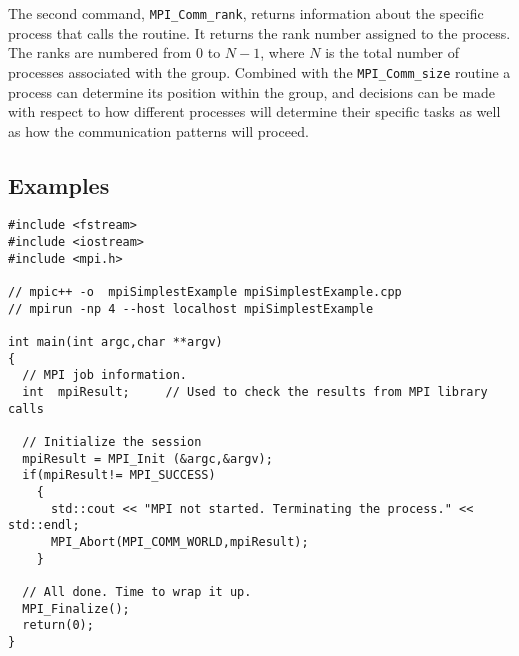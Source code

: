 The second command, \texttt{MPI\_Comm\_rank}, returns information
about the specific process that calls the routine. It returns the rank
number assigned to the process. The ranks are numbered from 0 to
$N-1$, where $N$ is the total number of processes associated with the
group. Combined with the \texttt{MPI\_Comm\_size} routine a process
can determine its position within the group, and decisions can be made
with respect to how different processes will determine their specific
tasks as well as how the communication patterns will proceed.

\subsection{Examples}


\lstset{language=C++, numbers=left, numberstyle=\tiny, stepnumber=1,
  numbersep=5pt, commentstyle=\scriptsize}
\begin{lstlisting}[caption={Simplest MPI Program},
                   basicstyle=\scriptsize,
                   label=listing:simplestProcess]
#include <fstream>
#include <iostream>
#include <mpi.h>

// mpic++ -o  mpiSimplestExample mpiSimplestExample.cpp 
// mpirun -np 4 --host localhost mpiSimplestExample

int main(int argc,char **argv)
{
  // MPI job information.
  int  mpiResult;     // Used to check the results from MPI library calls

  // Initialize the session
  mpiResult = MPI_Init (&argc,&argv);
  if(mpiResult!= MPI_SUCCESS)
    {
      std::cout << "MPI not started. Terminating the process." << std::endl;
      MPI_Abort(MPI_COMM_WORLD,mpiResult);
    }

  // All done. Time to wrap it up.
  MPI_Finalize();
  return(0);
}
\end{lstlisting}


